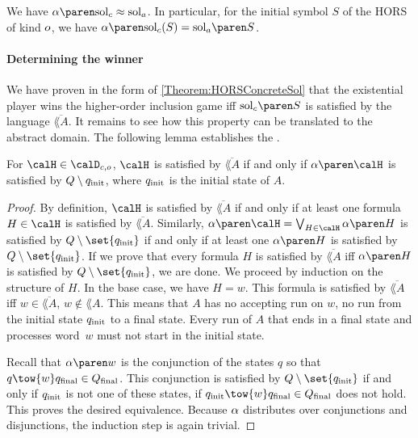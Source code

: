 \documentclass[../../diss.tex]{subfiles}
\begin{document}
\begin{corollary}%
\label{Corollary:HORSSolvingEFPT}%
    We have $\abs{\solc} \approx \sola$. In particular, for the initial symbol $S$ of the HORS of kind $o$, we have $\abs{\solc}(S) = \sola{S}$.
\end{corollary}

\paragraph{Determining the winner}

We have proven in the form of \cref{Theorem:HORSConcreteSol} that the existential player wins the higher-order inclusion game iff $\solc{S}$ is satisfied by the language $\overline{\lang{A}}$.
It remains to see how this property can be translated to the abstract domain.
The following lemma establishes the .

\begin{lemma}%
\label{Lemma:HORSSolvingAbsSatisfied}%
    For $\sof \in \domainc{\ground}$, $\sof$ is satisfied by $\overline{\lang{A}}$ if and only if $\abs{\sof}$ is satisfied by $Q \setminus q_{\text{init}}$, where $q_{\text{init}}$ is the initial state of $A$.
\end{lemma}

\begin{proof}
    By definition, $\sof$ is satisfied by $\overline{\lang{A}}$ if and only if at least one formula $H \in \sof$ is satisfied by $\overline{\lang{A}}$.
    Similarly, $\abs{\sof} = \bigvee_{H \in \sof} \abs{H}$ is satisfied by $Q \setminus \set{\qinit}$ if and only if at least one $\abs{H}$ is satisfied by $Q \setminus \set{\qinit}$.
    If we prove that every formula $H$ is satisfied by $\overline{\lang{A}}$ iff $\abs{H}$ is satisfied by $Q \setminus \set{\qinit}$, we are done.
    We proceed by induction on the structure of $H$.
    In the base case, we have $H = w$.
    This formula is satisfied by $\overline{\lang{A}}$ iff $w \in \overline{\lang{A}}$, \ie $w \not\in \lang{A}$.
    This means that $A$ has no accepting run on $w$, no run from the initial state $q_{\text{init}}$ to a final state.
    Every run of $A$ that ends in a final state and processes word~$w$ must not start in the initial state.

    Recall that $\abs{w}$ is the conjunction of the states $q$ so that $q \tow{w} \qfinal \in \QF$.
    This conjunction is satisfied by $Q \setminus \set{\qinit}$ if and only if $q_{\text{init}}$ is not one of these states, \ie if $\qinit \tow{w} \qfinal \in \QF$ does not hold.
    This proves the desired equivalence.
    Because $\abs$ distributes over conjunctions and disjunctions, the induction step is again trivial.
\end{proof}
\end{document}
